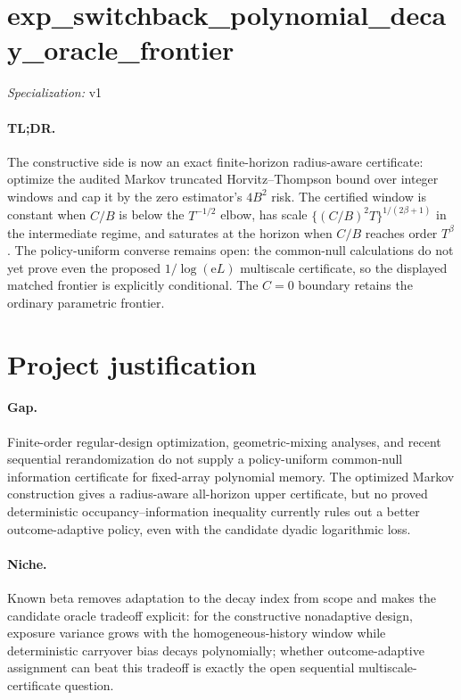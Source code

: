 \documentclass{article}
\begin{document}
\sloppy

\section*{exp\_\allowbreak{}switchback\_\allowbreak{}polynomial\_\allowbreak{}decay\_\allowbreak{}oracle\_\allowbreak{}frontier}

\noindent\textit{Specialization:} v1\par

\paragraph{TL;DR.} The constructive side is now an exact finite-horizon radius-aware certificate: optimize the audited Markov truncated Horvitz--Thompson bound over integer windows and cap it by the zero estimator's \(4B^2\) risk.  The certified window is constant when \(C/B\) is below the \(T^{-1/2}\) elbow, has scale \(\{(C/B)^2T\}^{1/(2\beta+1)}\) in the intermediate regime, and saturates at the horizon when \(C/B\) reaches order \(T^\beta\).  The policy-uniform converse remains open: the common-null calculations do not yet prove even the proposed \(1/\log(\mathrm eL)\) multiscale certificate, so the displayed matched frontier is explicitly conditional.  The \(C=0\) boundary retains the ordinary parametric frontier.

\section{Project justification}

\paragraph{Gap.} Finite-order regular-design optimization, geometric-mixing analyses, and recent sequential rerandomization do not supply a policy-uniform common-null information certificate for fixed-array polynomial memory.  The optimized Markov construction gives a radius-aware all-horizon upper certificate, but no proved deterministic occupancy--information inequality currently rules out a better outcome-adaptive policy, even with the candidate dyadic logarithmic loss.

\paragraph{Niche.} Known beta removes adaptation to the decay index from scope and makes the candidate oracle tradeoff explicit: for the constructive nonadaptive design, exposure variance grows with the homogeneous-history window while deterministic carryover bias decays polynomially; whether outcome-adaptive assignment can beat this tradeoff is exactly the open sequential multiscale-certificate question.
\end{document}
